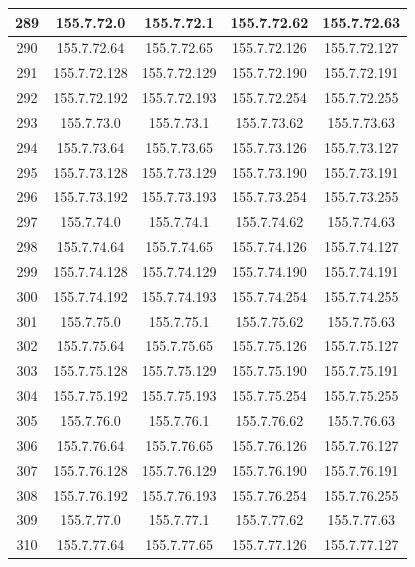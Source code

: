 \documentclass[letterpaper,12pt]{article}
\begin{document}
\begin{longtable}{|c|c|c|c|c|}
        289 & 155.7.72.0 & 155.7.72.1 & 155.7.72.62 & 155.7.72.63 \\ \hline
        290 & 155.7.72.64 & 155.7.72.65 & 155.7.72.126 & 155.7.72.127 \\ \hline
        291 & 155.7.72.128 & 155.7.72.129 & 155.7.72.190 & 155.7.72.191 \\ \hline
        292 & 155.7.72.192 & 155.7.72.193 & 155.7.72.254 & 155.7.72.255 \\ \hline
        293 & 155.7.73.0 & 155.7.73.1 & 155.7.73.62 & 155.7.73.63 \\ \hline
        294 & 155.7.73.64 & 155.7.73.65 & 155.7.73.126 & 155.7.73.127 \\ \hline
        295 & 155.7.73.128 & 155.7.73.129 & 155.7.73.190 & 155.7.73.191 \\ \hline
        296 & 155.7.73.192 & 155.7.73.193 & 155.7.73.254 & 155.7.73.255 \\ \hline
        297 & 155.7.74.0 & 155.7.74.1 & 155.7.74.62 & 155.7.74.63 \\ \hline
        298 & 155.7.74.64 & 155.7.74.65 & 155.7.74.126 & 155.7.74.127 \\ \hline
        299 & 155.7.74.128 & 155.7.74.129 & 155.7.74.190 & 155.7.74.191 \\ \hline
        300 & 155.7.74.192 & 155.7.74.193 & 155.7.74.254 & 155.7.74.255 \\ \hline
        301 & 155.7.75.0 & 155.7.75.1 & 155.7.75.62 & 155.7.75.63 \\ \hline
        302 & 155.7.75.64 & 155.7.75.65 & 155.7.75.126 & 155.7.75.127 \\ \hline
        303 & 155.7.75.128 & 155.7.75.129 & 155.7.75.190 & 155.7.75.191 \\ \hline
        304 & 155.7.75.192 & 155.7.75.193 & 155.7.75.254 & 155.7.75.255 \\ \hline
        305 & 155.7.76.0 & 155.7.76.1 & 155.7.76.62 & 155.7.76.63 \\ \hline
        306 & 155.7.76.64 & 155.7.76.65 & 155.7.76.126 & 155.7.76.127 \\ \hline
        307 & 155.7.76.128 & 155.7.76.129 & 155.7.76.190 & 155.7.76.191 \\ \hline
        308 & 155.7.76.192 & 155.7.76.193 & 155.7.76.254 & 155.7.76.255 \\ \hline
        309 & 155.7.77.0 & 155.7.77.1 & 155.7.77.62 & 155.7.77.63 \\ \hline
        310 & 155.7.77.64 & 155.7.77.65 & 155.7.77.126 & 155.7.77.127 \\ \hline

\end{longtable}
\end{document}
